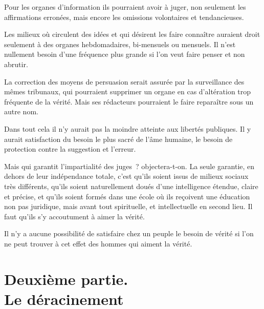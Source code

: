 \documentclass[french,twoside]{book} %
\begin{document}
\par
Pour les organes d'information ils pourraient avoir à juger, non seulement les affirmations erronées, mais encore les omissions volontaires et tendancieuses.\par
Les milieux où circulent des idées et qui désirent les faire connaître auraient droit seulement à des organes hebdomadaires, bi-mensuels ou mensuels. Il n'est nullement besoin d'une fréquence plus grande si l'on veut faire penser et non abrutir.\par
La correction des moyens de persuasion serait assurée par la surveillance des mêmes tribunaux, qui pourraient supprimer un organe en cas d'altération trop fréquente de la vérité. Mais ses rédacteurs pourraient le faire reparaître sous un autre nom.\par
Dans tout cela il n'y aurait pas la moindre atteinte aux libertés publiques. Il y aurait satisfaction du besoin le plus sacré de l'âme humaine, le besoin de protection contre la suggestion et l'erreur.\par
Mais qui garantit l'impartialité des juges ? objectera-t-on. La seule garantie, en dehors de leur indépendance totale, c'est qu'ils soient issus de milieux sociaux très différents, qu'ils soient naturellement doués d'une intelligence étendue, claire et précise, et qu'ils soient formés dans une école où ils reçoivent une éducation non pas juridique, mais avant tout spirituelle, et intellectuelle en second lieu. Il faut qu'ils s'y accoutument à aimer la vérité.\par
Il n'y a aucune possibilité de satisfaire chez un peuple le besoin de vérité si l'on ne peut trouver à cet effet des hommes qui aiment la vérité.
\section[{Deuxième partie. Le déracinement}]{Deuxième partie. \\
Le déracinement}\renewcommand{\leftmark}{Deuxième partie. \\
Le déracinement}
\end{document}
